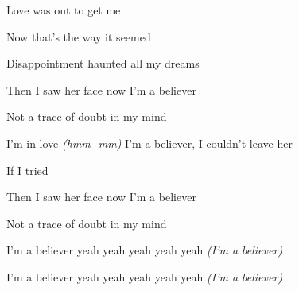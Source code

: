 \begin{song}
\bigskip

    \par
{}    \par
{} Love was out to get me  \par
{} Now that's the way it seemed  \par
{} Disappointment haunted all my dreams  \par

\bigskip

Then I saw her face   now I'm a believer   \par
Not a trace   of doubt in my mind   \par
I'm in love \textit{(hmm-}\textit{-mm)} I'm a believer, I couldn't leave her \par
If I tried \par

\bigskip

Then I saw her face   now I'm a believer   \par
Not a trace   of doubt in my mind   \par
I’m a believer yeah yeah yeah yeah yeah \textit{(I’m a be}\textit{liever)}   \par
I’m a believer yeah yeah yeah yeah yeah \textit{(I’m a be}\textit{liever)}   \par
{} \par

\end{song}